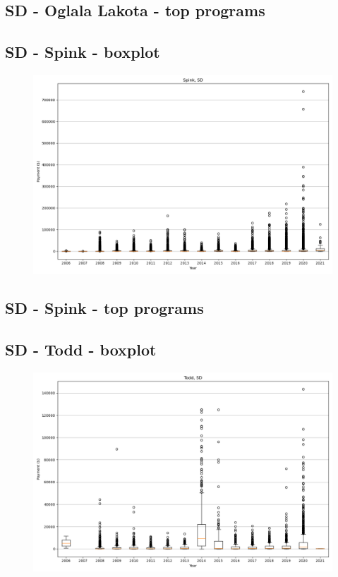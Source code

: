 \subsection*{SD - Oglala Lakota - top programs}

\newpage
\subsection*{SD - Spink - boxplot}
\begin{figure}[h]
\centering
\includegraphics[width=7in]{../output/boxplots/counties/Spink-SD_boxplot.png}
\end{figure}


\subsection*{SD - Spink - top programs}

\newpage
\subsection*{SD - Todd - boxplot}
\begin{figure}[h]
\centering
\includegraphics[width=7in]{../output/boxplots/counties/Todd-SD_boxplot.png}
\end{figure}


